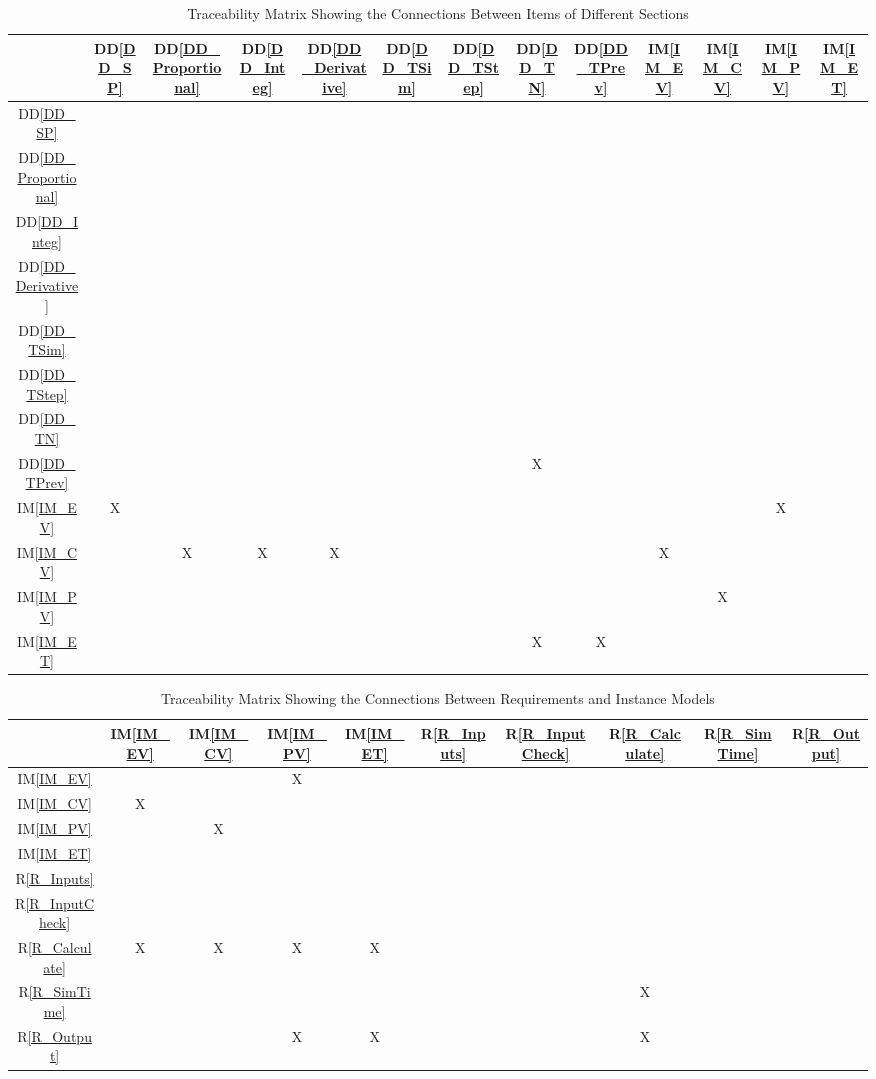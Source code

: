 \documentclass[12pt]{article}
\newcommand{\ddref}[1]{DD\ref{#1}}
\newcommand{\iref}[1]{IM\ref{#1}}
\newcommand{\rref}[1]{R\ref{#1}}
\begin{document}
\begin{table}[h!]
\centering
\begin{tabular}{|c|c|c|c|c|c|c|c|c|c|c|c|c|}
\hline        
	& \ddref{DD_SP}& \ddref{DD_Proportional} & \ddref{DD_Integ}& 
    \ddref{DD_Derivative} & \ddref{DD_TSim}& \ddref{DD_TStep}& 
    \ddref{DD_TN}& \ddref{DD_TPrev}& \iref{IM_EV}& \iref{IM_CV}& 
    \iref{IM_PV} & \iref{IM_ET}\\
\hline
\ddref{DD_SP}           & & & & & & & & & & & &\\ \hline
\ddref{DD_Proportional} & & & & & & & & & & & &\\ \hline
\ddref{DD_Integ}        & & & & & & & & & & & &\\ \hline
\ddref{DD_Derivative}   & & & & & & & & & & & &\\ \hline
\ddref{DD_TSim}         & & & & & & & & & & & &\\ \hline
\ddref{DD_TStep}        & & & & & & & & & & & &\\ \hline
\ddref{DD_TN}           & & & & & & & & & & & &\\ \hline
\ddref{DD_TPrev}        & & & & & & &X & & & & &\\ \hline
\iref{IM_EV}            &X & & & & & & & & & &X &\\ \hline
\iref{IM_CV}            & &X &X &X & & & & &X & & &\\ \hline
\iref{IM_PV}            & & & & & & & & & &X & &\\ \hline
\iref{IM_ET}            & & & & & & &X &X & & & &\\ \hline
\hline
\end{tabular}
\caption{Traceability Matrix Showing the Connections Between Items of Different Sections}
\label{Table:trace}
\end{table}

\begin{table}[h!]
\centering
\begin{tabular}{|c|c|c|c|c|c|c|c|c|c|}
\hline
	& \iref{IM_EV}& \iref{IM_CV}& \iref{IM_PV}& \iref{IM_ET} & 
    \rref{R_Inputs}& \rref{R_InputCheck}& \rref{R_Calculate}& 
    \rref{R_SimTime}& \rref{R_Output}\\
\hline
\iref{IM_EV}           & & &X & & & & & & \\ \hline
\iref{IM_CV}           &X & & & & & & & & \\ \hline
\iref{IM_PV}           & &X & & & & & & & \\ \hline
\iref{IM_ET}           & & & & & & & & & \\ \hline
\rref{R_Inputs}        & & & & & & & & & \\ \hline
\rref{R_InputCheck}    & & & & & & & & & \\ \hline
\rref{R_Calculate}     &X &X &X &X & & & & & \\ \hline
\rref{R_SimTime}       & & & & & & &X & & \\ \hline
\rref{R_Output}        & & &X &X & & &X & & \\
\hline
\end{tabular}
\caption{Traceability Matrix Showing the Connections Between Requirements and Instance Models}
\label{Table:R_trace}
\end{table}
\end{document}
